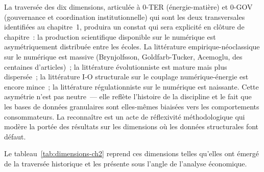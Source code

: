 La traversée des dix dimensions, articulée à 0-TER (énergie-matière) et 0-GOV (gouvernance et coordination institutionnelle) qui sont les deux transversales identifiées au chapitre~1, produira un constat qui sera explicité en clôture de chapitre~: la production scientifique disponible sur le numérique est asymétriquement distribuée entre les écoles. La littérature empirique-néoclassique sur le numérique est massive (Brynjolfsson, Goldfarb-Tucker, Acemoglu, des centaines d'articles)~; la littérature évolutionniste est mature mais plus dispersée~; la littérature I-O structurale sur le couplage numérique-énergie est encore mince~; la littérature régulationniste sur le numérique est naissante. Cette asymétrie n'est pas neutre~--- elle reflète l'histoire de la discipline et le fait que les bases de données granulaires sont elles-mêmes biaisées vers les comportements consommateurs. La reconnaître est un acte de réflexivité méthodologique qui modère la portée des résultats sur les dimensions où les données structurales font défaut.

Le tableau~\ref{tab:dimensions-ch2} reprend ces dimensions telles qu'elles ont émergé de la traversée historique et les présente sous l'angle de l'analyse économique.

